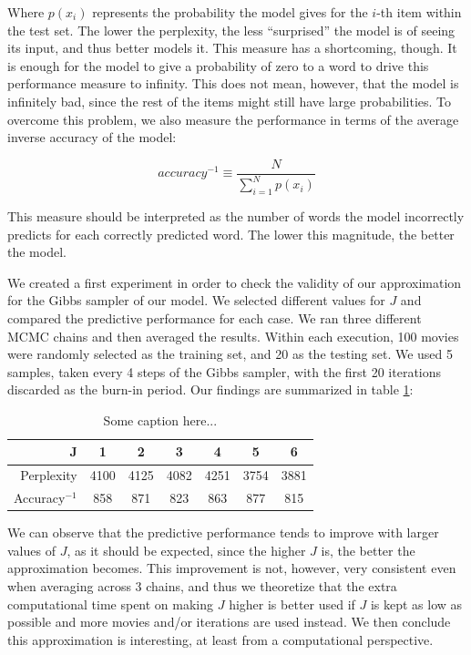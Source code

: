 \documentclass[a4paper,10pt]{article}
\begin{document}
Where $p(x_i)$ represents the probability the model gives for the $i$-th item within the test set. The lower the perplexity, the less ``surprised'' the model is of seeing its input, and thus better models it. This measure has a shortcoming, though. It is enough for the model to give a probability of zero to a word to drive this performance measure to infinity. This does not mean, however, that the model is infinitely bad, since the rest of the items might still have large probabilities. To overcome this problem, we also measure the performance in terms of the average inverse accuracy of the model:

\begin{equation}
	accuracy^{-1} \equiv \frac{N}{\sum_{i = 1}^N p(x_i)}
\end{equation}

This measure should be interpreted as the number of words the model incorrectly predicts for each correctly predicted word. The lower this magnitude, the better the model.

We created a first experiment in order to check the validity of our approximation for the Gibbs sampler of our model. We selected different values for $J$ and compared the predictive performance for each case. We ran three different MCMC chains and then averaged the results. Within each execution, 100 movies were randomly selected as the training set, and 20 as the testing set. We used 5 samples, taken every 4 steps of the Gibbs sampler, with the first 20 iterations discarded as the burn-in period. Our findings are summarized in table \ref{table:J}:

\begin{table}[ht!]
\label{table:J}
\begin{center}
\begin{tabular}{r|cccccc}
J               & 1 & 2 & 3 & 4 & 5 & 6 \\ \hline
Perplexity      & 4100 & 4125 & 4082 & 4251 & 3754 & 3881 \\
Accuracy$^{-1}$ & 858 & 871 & 823 & 863 & 877 & 815 \\
\end{tabular}
\end{center}

\caption{Some caption here...}
\end{table}

We can observe that the predictive performance tends to improve with larger values of $J$, as it should be expected, since the higher $J$ is, the better the approximation becomes. This improvement is not, however, very consistent even when averaging across 3 chains, and thus we theoretize that the extra computational time spent on making $J$ higher is better used if $J$ is kept as low as possible and more movies and/or iterations are used instead. We then conclude this approximation is interesting, at least from a computational perspective.
\end{document}
